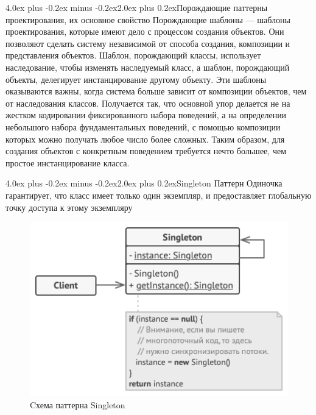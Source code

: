 \documentclass[12pt, a4paper]{book}%
\makeatletter
\renewcommand{\section}{\@startsection{section}{1}{1pt}%
{4.0ex plus -0.2ex minus -0.2ex}{2.0ex plus 0.2ex}{\centering\bf}}%
\makeatother
\begin{document}
{\section{Порождающие паттерны проектирования, их основное свойство}
Порождающие шаблоны — шаблоны проектирования, которые имеют дело с процессом создания объектов. Они позволяют сделать систему независимой от способа создания, композиции и представления объектов. Шаблон, порождающий классы, использует наследование, чтобы изменять наследуемый класс, а шаблон, порождающий объекты, делегирует инстанцирование другому объекту.
Эти шаблоны оказываются важны, когда система больше зависит от композиции объектов, чем от наследования классов. Получается так, что основной упор делается не на жестком кодировании фиксированного набора поведений, а на определении небольшого набора фундаментальных поведений, с помощью композиции которых можно получать любое число более сложных. Таким образом, для создания объектов с конкретным поведением требуется нечто большее, чем простое инстанцирование класса. 

\section{Singleton}
Паттерн Одиночка гарантирует, что класс имеет только один экземпляр, и предоставляет глобальную точку доступа к этому экземпляру
\begin{figure}[!ht]
\begin{center}
\includegraphics[scale=0.7]{images/pic/pic26-1.png}\caption{Cхема паттерна Singleton}\label{figure1}
\end{center}
\end{figure}
\newpage
}
\end{document}
